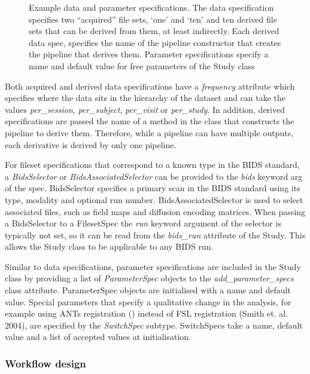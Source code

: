 \begin{figure}

\caption{Example data and parameter specifications. The data
specification specifies two ``acquired'' file sets, `one' and `ten' and
ten derived file sets that can be derived from them, at least
indirectly. Each derived data spec, specifies the name of the pipeline
constructor that creates the pipeline that derives them. Parameter
specifications specify a name and default value for free parameters of
the Study class}
\label{list:data_spec}
\end{figure}

Both acquired and derived data specifications have a \emph{frequency}
attribute which specifies where the data sits in the hierarchy of the
dataset and can take the values \emph{per\_session},
\emph{per\_subject}, \emph{per\_visit} or \emph{per\_study}. In
addition, derived specifications are passed the name of a method in the
class that constructs the pipeline to derive them. Therefore, while a
pipeline can have multiple outputs, each derivative is derived by only
one pipeline.

For fileset specifications that correspond to a known type in the BIDS
standard, a \emph{BidsSelector} or \emph{BidsAssociatedSelector} can be
provided to the \emph{bids} keyword arg of the spec. BidsSelector
specifies a primary scan in the BIDS standard using its type, modality
and optional run number. BidsAssociatedSelector is used to select
associated files, such as field maps and diffusion encoding matrices.
When passing a BidsSelector to a FilesetSpec the \emph{run} keyword
argument of the selector is typically not set, so it can be read from
the \emph{bids\_run} attribute of the Study. This allows the Study class
to be applicable to any BIDS run.

Similar to data specifications, parameter specifications are included in
the Study class by providing a list of \emph{ParameterSpec} objects to
the \emph{add\_parameter\_specs} class attribute. ParameterSpec objects
are initialised with a name and default value. Special parameters that
specify a qualitative change in the analysis, for example using ANTs
registration (\cite{avants_reproducible_2011}) instead of FSL registration (Smith
et. al. 2004), are specified by the \emph{SwitchSpec} subtype.
SwitchSpecs take a name, default value and a list of accepted values at
initialisation.

\subsubsection{Workflow design}
\label{workflow-design}

